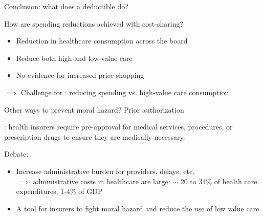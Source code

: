 \begin{frame}{Conclusion: what does a deductible do?}

    How are spending reductions achieved with cost-sharing?
    \begin{itemize}
        \item Reduction in healthcare consumption across the board
        \item Reduce both high-and low-value care
        \item No evidence for increased price shopping
    \end{itemize}
    \vspace{7mm}


    $\implies$ Challenge for : reducing spending vs. high-value care consumption


\end{frame}
\begin{frame}{Other ways to prevent moral hazard? Prior authorization}

    : health insurers require pre-approval for medical services, procedures, or prescription drugs to ensure they are medically necessary.\\
    \vspace{5mm}

    Debate:
    \begin{itemize}
        \item Increase administrative burden for providers, delays, etc.\\
        $\implies$ administrative costs in healthcare are large: $\sim$ 20 to 34\% of health care expenditures, 1-4\% of GDP
        \item A tool for insurers to fight moral hazard and reduce the use of low value care
    \end{itemize}

\end{frame}

